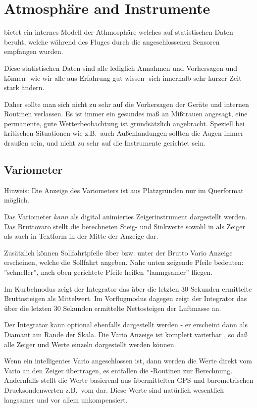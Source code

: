 \chapter{Atmosphäre and Instrumente}\label{cha:atmosph}
\xc bietet ein internes Modell der Athmosphäre welches auf statistischen Daten beruht,
welche während des Fluges durch die angeschlossenen Sensoren empfangen wurden.

Diese statistischen Daten sind alle lediglich Annahmen und Vorhersagen und können -wie wir alle
aus Erfahrung gut wissen-  sich innerhalb sehr kurzer Zeit stark ändern.

Daher sollte man sich nicht zu sehr auf die Vorhersagen der Geräte und internen Routinen verlassen.
Es ist immer ein gesundes maß an Mißtrauen angesagt, eine permanente, gute Wetterbeobachtung
ist grundsätzlich angebracht. Speziell bei kritischen Situationen wie z.B.\ auch
Außenlandungen sollten die Augen immer draußen sein, und nicht zu sehr auf die Instrumente
gerichtet sein.
\section{Variometer}
Hinweis:
Die Anzeige des Variometers ist aus Platzgründen nur im Querformat möglich.

Das Variometer \textsl{kann} als digital animiertes Zeigerinstrument dargestellt werden.
Das Bruttovaro stellt die berechneten Steig- und Sinkwerte sowohl in als Zeiger als
auch in Textform in der Mitte der Anzeige dar.

Zusätzlich können Sollfahrtpfeile über bzw. unter der Brutto Vario Anzeige erscheinen,
welche die Sollfahrt angeben. Nahc unten zeigende Pfeile bedeuten: ''schneller'', nach oben
gerichtete Pfeile heißen ''lanmgsamer'' fliegen.

Im Kurbelmodus zeigt der Integrator das über die letzten 30 Sekunden ermittelte Bruttosteigen als Mittelwert.
Im Vorflugmodus dagegen zeigt der Integrator das über die letzten 30 Sekunden ermittelte Nettosteigen der Luftmasse an.

Der Integrator kann optional ebenfalls dargestellt werden - er erscheint dann als Diamant am Rande der Skala.
Die Vario Anzeige ist komplett varierbar , so daß alle Zeiger und Werte einzeln dargestellt
werden können.

Wenn ein intelligentes Vario angeschlossen ist, dann werden die Werte direkt vom Vario an den Zeiger
übertragen, es entfallen die \xc-Routinen zur Berechnung. Andernfalls stellt  \xc die Werte basierend aus
übermittelten GPS und barometrischen Drucksondenwerten z.B.\ vom \fl dar. Diese Werte sind natürlich wesentlich
langsamer und vor allem unkompensiert.

